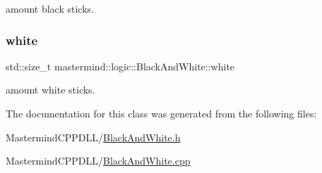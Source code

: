 amount black sticks. 

\hypertarget{classmastermind_1_1logic_1_1_black_and_white_ad5a31a26cbaf5294fac2f6ddf565408d}{}\label{classmastermind_1_1logic_1_1_black_and_white_ad5a31a26cbaf5294fac2f6ddf565408d} 
\subsubsection{\texorpdfstring{white}{white}}
{\footnotesize\ttfamily std\+::size\+\_\+t mastermind\+::logic\+::\+Black\+And\+White\+::white\hspace{0.3cm}{\ttfamily [private]}}



amount white sticks. 



The documentation for this class was generated from the following files\+:\begin{DoxyCompactItemize}
\item 
Mastermind\+C\+P\+P\+D\+L\+L/\hyperlink{_black_and_white_8h}{Black\+And\+White.\+h}\item 
Mastermind\+C\+P\+P\+D\+L\+L/\hyperlink{_black_and_white_8cpp}{Black\+And\+White.\+cpp}\end{DoxyCompactItemize}
